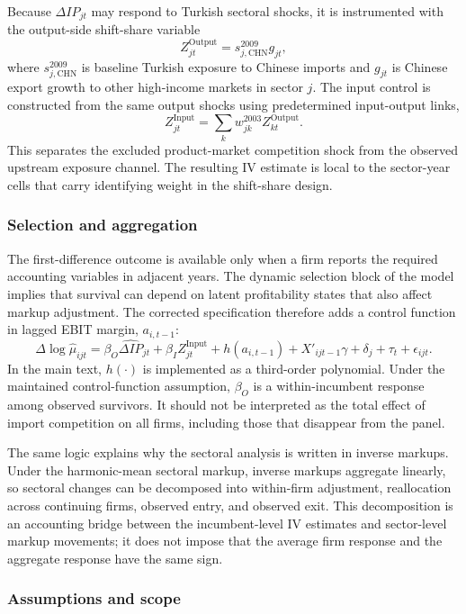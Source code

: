 ﻿\documentclass[12pt]{article}
\begin{document}
Because \(\Delta IP_{jt}\) may respond to Turkish sectoral shocks, it is instrumented with the output-side shift-share variable
\[
Z_{jt}^{\text{Output}}
=
s_{j,\text{CHN}}^{2009} g_{jt},
\]
where \(s_{j,\text{CHN}}^{2009}\) is baseline Turkish exposure to Chinese imports and \(g_{jt}\) is Chinese export growth to other high-income markets in sector \(j\). The input control is constructed from the same output shocks using predetermined input-output links,
\[
Z_{jt}^{\text{Input}}
=
\sum_k w_{jk}^{2003}Z_{kt}^{\text{Output}}.
\]
This separates the excluded product-market competition shock from the observed upstream exposure channel. The resulting IV estimate is local to the sector-year cells that carry identifying weight in the shift-share design.

\subsubsection*{Selection and aggregation}

The first-difference outcome is available only when a firm reports the required accounting variables in adjacent years. The dynamic selection block of the model implies that survival can depend on latent profitability states that also affect markup adjustment. The corrected specification therefore adds a control function in lagged EBIT margin, \(a_{i,t-1}\):
\[
\Delta \log \hat\mu_{ijt}
=
\beta_O \widehat{\Delta IP}_{jt}
+
\beta_I Z_{jt}^{\text{Input}}
+
h(a_{i,t-1})
+
X'_{ijt-1}\gamma
+
\delta_j
+
\tau_t
+
\epsilon_{ijt}.
\]
In the main text, \(h(\cdot)\) is implemented as a third-order polynomial. Under the maintained control-function assumption, \(\beta_O\) is a within-incumbent response among observed survivors. It should not be interpreted as the total effect of import competition on all firms, including those that disappear from the panel.

The same logic explains why the sectoral analysis is written in inverse markups. Under the harmonic-mean sectoral markup, inverse markups aggregate linearly, so sectoral changes can be decomposed into within-firm adjustment, reallocation across continuing firms, observed entry, and observed exit. This decomposition is an accounting bridge between the incumbent-level IV estimates and sector-level markup movements; it does not impose that the average firm response and the aggregate response have the same sign.

\subsubsection*{Assumptions and scope}
\end{document}
